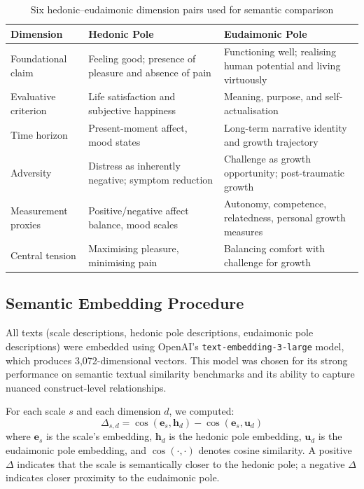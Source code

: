 \documentclass[12pt,a4paper]{article}
\newcommand{\Ddelta}{$\Delta$}
\begin{document}
\begin{table}[ht]
\centering
\caption{Six hedonic--eudaimonic dimension pairs used for semantic comparison}
\label{tab:dimensions}
\small
\begin{tabularx}{\textwidth}{lXX}
\toprule
\textbf{Dimension} & \textbf{Hedonic Pole} & \textbf{Eudaimonic Pole} \\
\midrule
Foundational claim & Feeling good; presence of pleasure and absence of pain & Functioning well; realising human potential and living virtuously \\
Evaluative criterion & Life satisfaction and subjective happiness & Meaning, purpose, and self-actualisation \\
Time horizon & Present-moment affect, mood states & Long-term narrative identity and growth trajectory \\
Adversity & Distress as inherently negative; symptom reduction & Challenge as growth opportunity; post-traumatic growth \\
Measurement proxies & Positive/negative affect balance, mood scales & Autonomy, competence, relatedness, personal growth measures \\
Central tension & Maximising pleasure, minimising pain & Balancing comfort with challenge for growth \\
\bottomrule
\end{tabularx}
\end{table}

\subsection{Semantic Embedding Procedure}\label{sec:embedding}

All texts (scale descriptions, hedonic pole descriptions, eudaimonic pole descriptions) were embedded using OpenAI's \texttt{text-embedding-3-large} model, which produces 3{,}072-dimensional vectors.
This model was chosen for its strong performance on semantic textual similarity benchmarks and its ability to capture nuanced construct-level relationships.

For each scale $s$ and each dimension $d$, we computed:
\begin{equation}
\Delta_{s,d} = \cos(\mathbf{e}_s, \mathbf{h}_d) - \cos(\mathbf{e}_s, \mathbf{u}_d)
\label{eq:delta}
\end{equation}
where $\mathbf{e}_s$ is the scale's embedding, $\mathbf{h}_d$ is the hedonic pole embedding, $\mathbf{u}_d$ is the eudaimonic pole embedding, and $\cos(\cdot,\cdot)$ denotes cosine similarity.
A positive \Ddelta{} indicates that the scale is semantically closer to the hedonic pole; a negative \Ddelta{} indicates closer proximity to the eudaimonic pole.
\end{document}
